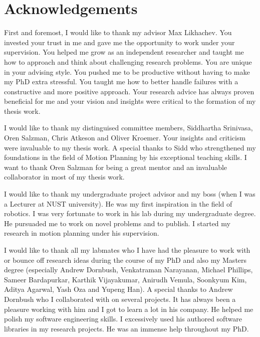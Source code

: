\documentclass[a4paper]{report}
\begin{document}
\begin{abstract}


\end{abstract}
\newpage

\chapter*{Acknowledgements}
First and foremost, I would like to thank my advisor Max Likhachev. You invested your trust in me and gave me the opportunity to work under your supervision. 
You helped me grow as an independent researcher and taught me how to approach and think about challenging research problems.
You are unique in your advising style. You pushed me to be productive without having to make my PhD extra stressful. You taught me how to better handle failures with a constructive and more positive approach. Your research advice has always proven beneficial for me and your vision and insights were critical to the formation of my thesis work.

I would like to thank my distinguised committee members, Siddhartha Srinivasa, Oren Salzman, Chris Atkeson and Oliver Kroemer. Your insights and criticism were invaluable to my thesis work. A special thanks to Sidd who strengthened my foundations in the field of Motion Planning by his exceptional teaching skills. I want to thank Oren Salzman for being a great mentor and an invaluable collaborator in most of my thesis work.

I would like to thank my undergraduate project advisor and my boss (when I was a Lecturer at NUST university). He was my first inspiration in the field of robotics. I was very fortunate to work in his lab during my undergraduate degree. He pursuaded me to work on novel problems and to publish.
I started my research in motion planning under his supervision.


I would like to thank all my labmates who I have had the pleasure to work with or bounce off research ideas during the course of my PhD and also my Masters degree (especially Andrew Dornbush, Venkatraman Narayanan, Michael Phillips, Sameer Bardapurkar, Karthik Vijayakumar, Anirudh Vemula, Soonkyum Kim, Aditya Agarwal, Yash Oza and Yupeng Han). A special thanks to Andrew Dornbush who I collaborated with on several projects. It has always been a pleasure working with him and I got to learn a lot in his company. He helped me polish my software engineering skills. I excessively used his authored software libraries in my research projects. He was an immense help throughout my PhD.
\end{document}

